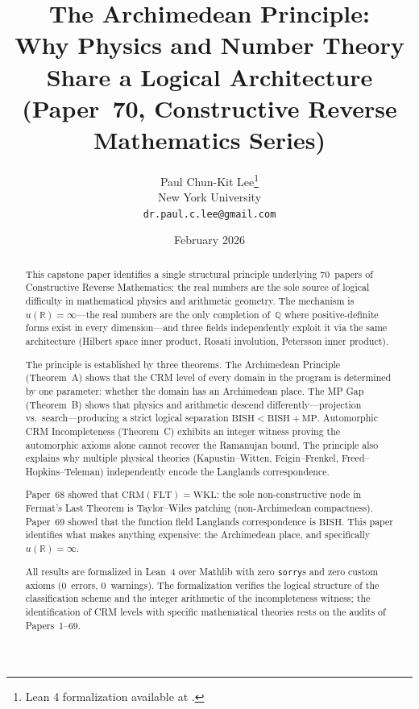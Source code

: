 \documentclass[11pt]{article}
\title{The Archimedean Principle:\\
Why Physics and Number Theory Share a Logical Architecture\\[6pt]
{\large (Paper~70, Constructive Reverse Mathematics Series)}}
\author{Paul Chun-Kit Lee\thanks{Lean 4 formalization available at \leanRepo.} \\
New York University \\
\texttt{dr.paul.c.lee@gmail.com}}
\date{February 2026}
\theoremstyle{definition}
\theoremstyle{remark}
\newcommand{\Q}{\mathbb{Q}}
\newcommand{\R}{\mathbb{R}}
\newcommand{\BISH}{\mathrm{BISH}}
\newcommand{\WKL}{\mathrm{WKL}}
\newcommand{\MP}{\mathrm{MP}}
\newcommand{\CRM}{\mathrm{CRM}}
\begin{document}
\maketitle


\begin{abstract}
This capstone paper identifies a single structural principle underlying 70~papers of Constructive Reverse Mathematics: the real numbers are the sole source of logical difficulty in mathematical physics and arithmetic geometry. The mechanism is $u(\R) = \infty$---the real numbers are the only completion of~$\Q$ where positive-definite forms exist in every dimension---and three fields independently exploit it via the same architecture (Hilbert space inner product, Rosati involution, Petersson inner product).

The principle is established by three theorems. The Archimedean Principle (Theorem~A) shows that the CRM level of every domain in the program is determined by one parameter: whether the domain has an Archimedean place. The MP Gap (Theorem~B) shows that physics and arithmetic descend differently---projection vs.\ search---producing a strict logical separation $\BISH < \BISH + \MP$. Automorphic CRM Incompleteness (Theorem~C) exhibits an integer witness proving the automorphic axioms alone cannot recover the Ramanujan bound. The principle also explains why multiple physical theories (Kapustin--Witten, Feigin--Frenkel, Freed--Hopkins--Teleman) independently encode the Langlands correspondence.

Paper~68 showed that $\CRM(\mathrm{FLT}) = \WKL$: the sole non-constructive node in Fermat's Last Theorem is Taylor--Wiles patching (non-Archimedean compactness). Paper~69 showed that the function field Langlands correspondence is $\BISH$. This paper identifies what makes anything expensive: the Archimedean place, and specifically $u(\R) = \infty$.

All results are formalized in Lean~4 over Mathlib with zero \texttt{sorry}s and zero custom axioms (0~errors, 0~warnings). The formalization verifies the logical structure of the classification scheme and the integer arithmetic of the incompleteness witness; the identification of CRM levels with specific mathematical theories rests on the audits of Papers~1--69.
\end{abstract}

\tableofcontents
\end{document}
